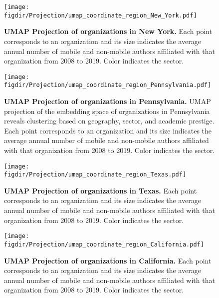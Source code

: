 \documentclass[12pt]{article} %
\def\figdir{../Figs}
\begin{document}
%
%
\begin{figure}[hp!]
	\centering
	\texttt{[image: \\figdir/Projection/umap\_coordinate\_region\_New\_York.pdf]}
	\caption{
		\textbf{UMAP Projection of organizations in New York.}
		Each point corresponds to an organization and its size indicates the average annual number of mobile and non-mobile authors affiliated with that organization from 2008 to 2019.
		Color indicates the sector.
	}
	\label{fig:supp:proj_newyork}
\end{figure}


%
%
\begin{figure}[hp!]
	\centering
	\texttt{[image: \\figdir/Projection/umap\_coordinate\_region\_Pennsylvania.pdf]}
	\caption{
		\textbf{UMAP Projection of organizations in Pennsylvania.}
		UMAP projection of the embedding space of organizations in Pennsylvania reveals clustering based on geography, sector, and academic prestige.
		Each point corresponds to an organization and its size indicates the average annual number of mobile and non-mobile authors affiliated with that organization from 2008 to 2019.
		Color indicates the sector.
	}
	\label{fig:supp:proj_pennsylvania}
\end{figure}


%
%
\begin{figure}[hp!]
	\centering
	\texttt{[image: \\figdir/Projection/umap\_coordinate\_region\_Texas.pdf]}
	\caption{
		\textbf{UMAP Projection of organizations in Texas.}
		Each point corresponds to an organization and its size indicates the average annual number of mobile and non-mobile authors affiliated with that organization from 2008 to 2019.
		Color indicates the sector.
	}
	\label{fig:supp:proj_texas}
\end{figure}



%
%
\begin{figure}[hp!]
	\centering
	\texttt{[image: \\figdir/Projection/umap\_coordinate\_region\_California.pdf]}
	\caption{
		\textbf{UMAP Projection of organizations in California.}
		Each point corresponds to an organization and its size indicates the average annual number of mobile and non-mobile authors affiliated with that organization from 2008 to 2019.
		Color indicates the sector.
	}
	\label{fig:supp:proj_california}
\end{figure}
\end{document}
